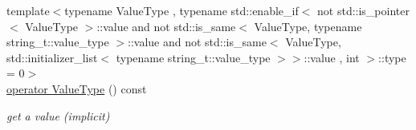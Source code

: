 \begin{DoxyCompactItemize}
{\footnotesize template$<$typename Value\+Type , typename std\+::enable\+\_\+if$<$                                                                      not std\+::is\+\_\+pointer$<$ Value\+Type $>$\+::value                                                                   and not std\+::is\+\_\+same$<$ Value\+Type, typename string\+\_\+t\+::value\+\_\+type $>$\+::value                                                                   and not std\+::is\+\_\+same$<$ Value\+Type, std\+::initializer\+\_\+list$<$ typename string\+\_\+t\+::value\+\_\+type $>$$>$\+::value                                                                   , int $>$\+::type  = 0$>$ }\\\hyperlink{a00025_aef496a56163710084e13612ab73e6ed2}{operator Value\+Type} () const 
\begin{DoxyCompactList}\small\item\em get a value (implicit) \end{DoxyCompactList}\end{DoxyCompactItemize}
